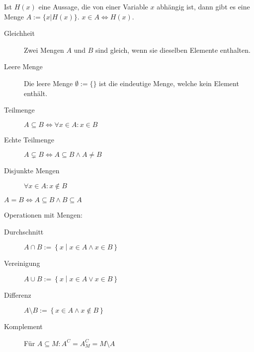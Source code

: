 Ist $H(x)$ eine Aussage, die von einer Variable $x$ abhängig ist, dann gibt es eine Menge $A := \{x|H(x)\}$. $x \in A \iff H(x)$.

\begin{definition}
  \begin{description}
  \item[Gleichheit] Zwei Mengen $A$ und $B$ sind gleich, wenn sie dieselben Elemente enthalten.
  \item[Leere Menge] Die leere Menge $\emptyset := \{\}$ ist die eindeutige Menge, welche kein Element enthält.\index[sym]{$\emptyset$}
  \item[Teilmenge] $A \subseteq B \iff \forall x \in A: x \in B$\index[sym]{$\subseteq$}
  \item[Echte Teilmenge] $A \subsetneq B \iff A \subseteq B \wedge A \ne B$\index[sym]{$\subsetneq$}
  \item[Disjunkte Mengen] $\forall x \in A: x \not\in B$
  \end{description}
\end{definition}
\begin{remark}
  $A = B \iff A \subseteq B \wedge B \subseteq A$
\end{remark}

\begin{definition}
  Operationen mit Mengen:
  \begin{description}
  \item[Durchschnitt] $A \cap B := \left\{ x \middle| x \in A \wedge x \in B \right\}$\index[sym]{$\cap$}
  \item[Vereinigung] $A \cup B := \left\{ x \middle| x \in A \vee x \in B \right\}$\index[sym]{$\cup$}
  \item[Differenz] $A \setminus B := \left\{ x \in A \wedge x \not\in B \right\}$\index[sym]{$\setminus$}
  \item[Komplement] Für $A \subseteq M: A^C = A^C_M = M \setminus A$
  \end{description}
\end{definition}

